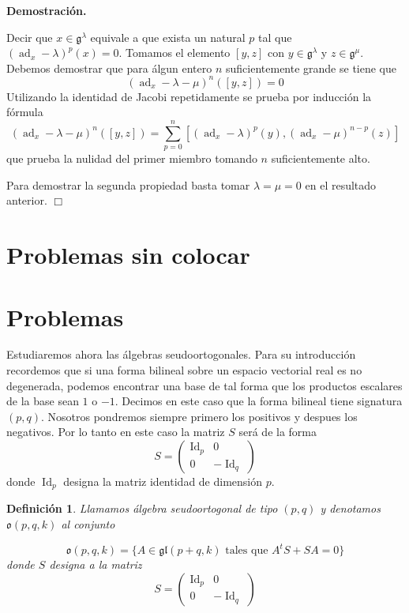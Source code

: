\documentclass[a4paper,draft,12pt]{article}
\newtheorem{defi}{Definición}[section]%
\newcommand{\dem}{\noindent \textbf{Demostración. }\vspace{0.3 cm}}%
\newcommand{\g}{\mathfrak{g}}%
\newcommand{\fin}{ $\Box $ \vspace{0.4 cm}}
\newcommand{\df}[1]{\textsf{\color{blue}#1}}
\DeclareMathOperator{\Id}{Id}%
\DeclareMathOperator{\ad}{ad}  %
\begin{document}
 \dem
 
 Decir que $x \in \g^\lambda$ equivale a que exista un natural $p$ tal que $(\ad_x-\lambda)^p(x)=0$.  Tomamos el elemento $[y,z]$ con $y\in \g^\lambda$ y $z\in \g^\mu$. Debemos demostrar que para álgun entero $n$ suficientemente grande se tiene que
 $$
 (\ad_x-\lambda- \mu)^n ([y,z])=0
 $$
 Utilizando la identidad de Jacobi repetidamente se prueba por inducción la fórmula
 $$
 (\ad_x-\lambda- \mu)^n ([y,z])= \sum_{p=0}^n[(\ad_x-\lambda)^p(y), (\ad_x-\mu)^{n-p}(z)]
 $$ 
 que prueba la nulidad del primer miembro tomando $n$ suficientemente alto.
 
 Para demostrar la segunda propiedad basta tomar $\lambda=\mu=0$ en el resultado anterior.  \fin
 


\newpage

\section{Problemas sin colocar}



\section*{Problemas}



Estudiaremos ahora las álgebras seudoortogonales. Para su introducción recordemos que si una forma bilineal sobre un espacio vectorial real es no degenerada, podemos encontrar una base de tal forma que los productos escalares de la base sean $1$ o $-1$.  Decimos en este caso que la forma bilineal tiene signatura $(p,q)$.  Nosotros pondremos siempre primero los positivos y despues los negativos.  Por lo tanto en este caso la matriz $S$ será de la forma
$$
S= \begin{pmatrix}
\Id_p& 0 \\
0 & -\Id_q
\end{pmatrix}
$$
donde $\Id_p$ designa la matriz identidad de dimensión $p$.

\begin{defi}

Llamamos  \df{álgebra seudoortogonal} de tipo $(p,q)$  y denotamos $\mathfrak{o}(p,q, k)$ al conjunto 

$$
\mathfrak{o}(p,q,k)= \{A \in \mathfrak{gl}(p+q,k) \text{ tales que } A^tS+SA=0 \}
$$
donde $S$ designa a la matriz
$$
S= \begin{pmatrix}
\Id_p& 0 \\
0 & -\Id_q
\end{pmatrix}
$$

\end{defi}
\end{document}
